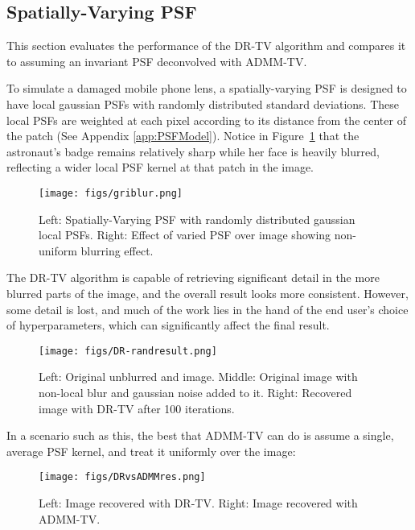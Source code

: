 \documentclass[sigconf]{acmart}
\begin{document}
\subsection{Spatially-Varying PSF}\label{sec:drtv}
This section evaluates the performance of the DR-TV algorithm and compares it to assuming an invariant PSF deconvolved with ADMM-TV.

To simulate a damaged mobile phone lens, a spatially-varying PSF is designed to have local gaussian PSFs with randomly distributed standard deviations. These local PSFs are weighted at each pixel according to its distance from the center of the patch (See Appendix \ref{app:PSFModel}). Notice in Figure~\ref{fig:random_psf_blur} that the astronaut's badge remains relatively sharp while her face is heavily blurred, reflecting a wider local PSF kernel at that patch in the image.

\begin{figure}[h]
  \centering
  \texttt{[image: figs/griblur.png]}
  \caption{Left: Spatially-Varying PSF with randomly distributed gaussian local PSFs. Right: Effect of varied PSF over image showing non-uniform blurring effect.}
  \label{fig:random_psf_blur}
\end{figure}

The DR-TV algorithm is capable of retrieving significant detail in the more blurred parts of the image, and the overall result looks more consistent. However, some detail is lost, and much of the work lies in the hand of the end user's choice of hyperparameters, which can significantly affect the final result.

\begin{figure}[h]
  \centering
  \texttt{[image: figs/DR-randresult.png]}
  \caption{Left: Original unblurred and image. Middle: Original image with non-local blur and gaussian noise added to it. Right: Recovered image with DR-TV after 100 iterations.}
  \label{fig:dr-randres}
\end{figure}

In a scenario such as this, the best that ADMM-TV can do is assume a single, average PSF kernel, and treat it uniformly over the image:

\begin{figure}[h]
  \centering
  \texttt{[image: figs/DRvsADMMres.png]}
  \caption{Left: Image recovered with DR-TV. Right: Image recovered with ADMM-TV.}
  \label{fig:dr-randres}
\end{figure}
\end{document}
